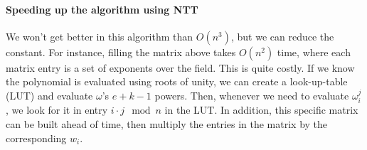 
\paragraph{Speeding up the algorithm using NTT}
We won't get better in this algorithm than $O(n^3)$, but we can reduce the constant.
For instance, filling the matrix above takes $O(n^2)$ time, where each matrix entry is a set of 
exponents over the field. This is quite costly. 
If we know the polynomial is evaluated using roots of unity, we can 
create a look-up-table (LUT) and evaluate $\omega$'s $e+k-1$ powers. 
Then, whenever we need to evaluate $\omega_i^j$, we look for it in entry $i\cdot j \mod n$ 
in the LUT.
In addition, this specific matrix can be built ahead of time, then multiply the entries in 
the matrix by the corresponding $w_i$. 


